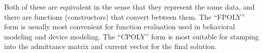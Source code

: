 Both of these are equivalent in the sense that they represent the same
data, and there are functions (constructors) that convert between
them.  The ``FPOLY'' form is usually most convenient for function
evaluation used in behavioral modeling and device modeling.  The
``CPOLY'' form is most suitable for stamping into the admittance
matrix and current vector for the final solution.
